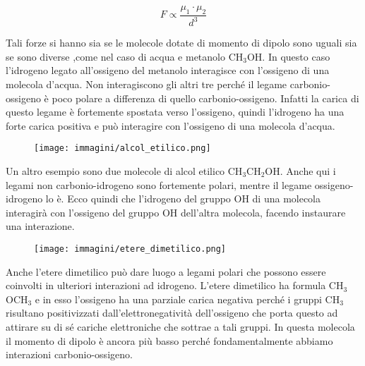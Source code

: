 $$F \propto \frac{\mu_1 \cdot \mu_2}{d^3}$$

Tali forze si hanno sia se le molecole dotate di momento di dipolo sono uguali sia se sono diverse ,come nel caso di acqua e metanolo CH$_3$OH. In questo caso l'idrogeno legato all'ossigeno del metanolo interagisce con l'ossigeno di una molecola d'acqua. Non interagiscono gli altri tre perché il legame carbonio-ossigeno è poco polare a differenza di quello carbonio-ossigeno. Infatti la carica di questo legame è fortemente spostata verso l'ossigeno, quindi l'idrogeno ha una forte carica positiva e può interagire con l'ossigeno di una molecola d'acqua.

\hspace{0.5cm}\begin{minipage}{0.35 \textwidth}
    \begin{figure}[H]
        \texttt{[image: immagini/alcol\_etilico.png]}
    \end{figure}
\end{minipage}
\begin{minipage}{0.6 \textwidth}
    \vspace{0.6cm}Un altro esempio sono due molecole di alcol etilico CH$_3$CH$_2$OH. Anche qui i legami non carbonio-idrogeno sono fortemente polari, mentre il legame ossigeno-idrogeno lo è. Ecco quindi che l'idrogeno del gruppo OH di una molecola interagirà con l'ossigeno del gruppo OH dell'altra molecola, facendo instaurare una interazione.
\end{minipage}

\hspace{0.5cm}\begin{minipage}{0.35 \textwidth}
    \begin{figure}[H]
        \texttt{[image: immagini/etere\_dimetilico.png]}
    \end{figure}
\end{minipage}
\begin{minipage}{0.6 \textwidth}
    \vspace{0.6cm}Anche l'etere dimetilico può dare luogo a legami polari che possono essere coinvolti in ulteriori interazioni ad idrogeno. L'etere dimetilico ha formula CH$_3$OCH$_3$ e in esso l'ossigeno ha una parziale carica negativa perché i gruppi CH$_3$ risultano positivizzati dall'elettronegatività dell'ossigeno che porta questo ad attirare su di sé cariche elettroniche che sottrae a tali gruppi. In questa molecola il momento di dipolo è ancora più basso perché fondamentalmente abbiamo interazioni carbonio-ossigeno.
\end{minipage}

